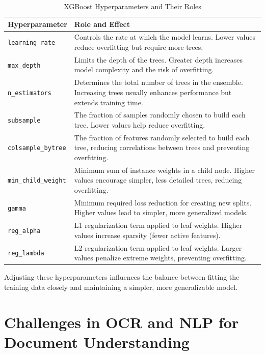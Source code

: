 \documentclass{SGGW-thesis-EN}
\begin{document}
\begin{table}[h!]
  \centering
  \caption{XGBoost Hyperparameters and Their Roles}
  \label{tab:xgboost_hyperparameters}
  \begin{tabularx}{\textwidth}{|l|X|}
  \hline
  \textbf{Hyperparameter} & \textbf{Role and Effect} \\ \hline
  \texttt{learning\_rate} & Controls the rate at which the model learns. Lower values reduce overfitting but require more trees. \\ \hline
  \texttt{max\_depth} & Limits the depth of the trees. Greater depth increases model complexity and the risk of overfitting. \\ \hline
  \texttt{n\_estimators} & Determines the total number of trees in the ensemble. Increasing trees usually enhances performance but extends training time. \\ \hline
  \texttt{subsample} & The fraction of samples randomly chosen to build each tree. Lower values help reduce overfitting. \\ \hline
  \texttt{colsample\_bytree} & The fraction of features randomly selected to build each tree, reducing correlations between trees and preventing overfitting. \\ \hline
  \texttt{min\_child\_weight} & Minimum sum of instance weights in a child node. Higher values encourage simpler, less detailed trees, reducing overfitting. \\ \hline
  \texttt{gamma} & Minimum required loss reduction for creating new splits. Higher values lead to simpler, more generalized models. \\ \hline
  \texttt{reg\_alpha} & L1 regularization term applied to leaf weights. Higher values increase sparsity (fewer active features). \\ \hline
  \texttt{reg\_lambda} & L2 regularization term applied to leaf weights. Larger values penalize extreme weights, preventing overfitting. \\ \hline
  \end{tabularx}
  \end{table}

Adjusting these hyperparameters influences the balance between fitting the training data closely and maintaining a simpler, more generalizable model.

\section{Challenges in OCR and NLP for Document Understanding}
\end{document}
